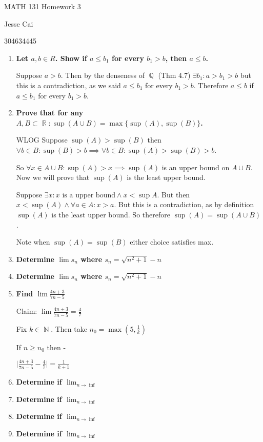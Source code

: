 \documentclass[10pt,a4paper]{article}
\DeclareMathOperator*{\R}{\mathbb{R}}
\DeclareMathOperator*{\Q}{\mathbb{Q}}
\DeclareMathOperator*{\N}{\mathbb{N}}
\begin{document}
MATH 131 Homework 3

Jesse Cai

304634445

\begin{enumerate}
    \item \textbf{Let $a, b \in R$. Show if $a \leq b_1$ for every $b_1 > b$, then $a \leq b$.}

        Suppose $a > b$. Then by the denseness of $\Q$ (Thm 4.7) $\exists b_1 : a > b_1> b$ but this is a contradiction, as we said $a \leq b_1$ for every $b_1 > b$. Therefore $ a \leq b$ if $a \leq b_1$ for every $b_1 > b$.

    \item \textbf{Prove that for any $A,B \subset \R: \sup(A\cup B) = \max \{\sup(A), \sup(B)\}$.}

        WLOG Suppose $\sup(A) > \sup(B)$ then $\forall b \in B: \sup(B) > b \implies \forall b \in B: \sup(A) > \sup(B) > b$.
        
        So $\forall x \in A\cup B: \sup(A) > x \implies \sup(A)$ is an upper bound on $A \cup B$. Now we will prove that $\sup(A)$ is the least upper bound. 

        Suppose $\exists x : x \text{ is a upper bound} \land x < \sup A$. But then $x < \sup(A) \land \forall a \in A: x > a$. But this is a contradiction, as by definition $\sup(A)$ is the least upper bound. So therefore $\sup(A) = \sup (A\cup B)$.

        Note when $\sup(A) = \sup(B)$ either choice satisfies max.

    \item \textbf{Determine $\lim s_n$ where $s_n = \sqrt{n^2 +1} -n $ }

    \item \textbf{Determine $\lim s_n$ where $s_n = \sqrt{n^2 +1} -n $ }

    \item \textbf{Find $\lim \frac{4n+3}{7n-5}$ }

        Claim: $\lim \frac{4n+3}{7n-5} = \frac{4}{7}$

        Fix $k \in \N$. Then take $n_0 = \max (5, \frac{1}{k})$

        If $n \geq n_0$ then \frac{} -  \geq

        $ \lvert \frac{4n+3}{7n-5}- \frac{4}{7} \rvert = \frac{1}{k+1}$

    \item \textbf{Determine if $\lim_{n \to \inf}$ }
    \item \textbf{Determine if $\lim_{n \to \inf}$ }
    \item \textbf{Determine if $\lim_{n \to \inf}$ }
    \item \textbf{Determine if $\lim_{n \to \inf}$ }

\end{enumerate}
\end{document}
